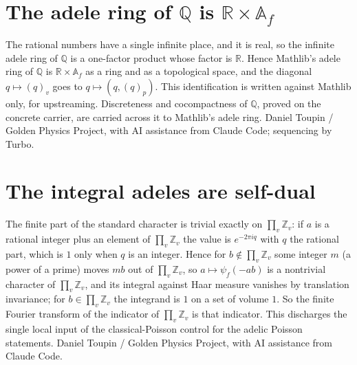 \documentclass{report}
\theoremstyle{definition}
\begin{document}
\begin{itemize}
\begin{itemize}
\section{The adele ring of $\mathbb Q$ is $\mathbb R\times\mathbb A_f$}
The rational numbers have a single infinite place, and it is real, so the infinite adele ring of $\mathbb Q$ is a one-factor product whose factor is $\mathbb R$. Hence Mathlib's adele ring of $\mathbb Q$ is $\mathbb R\times\mathbb A_f$ as a ring and as a topological space, and the diagonal $q\mapsto(q)_v$ goes to $q\mapsto(q,(q)_p)$. This identification is written against Mathlib only, for upstreaming. Discreteness and cocompactness of $\mathbb Q$, proved on the concrete carrier, are carried across it to Mathlib's adele ring.
Daniel Toupin / Golden Physics Project, with AI assistance from Claude Code; sequencing by Turbo.

\section{The integral adeles are self-dual}
The finite part of the standard character is trivial exactly on $\prod_v\mathbb Z_v$: if $a$ is a rational integer plus an element of $\prod_v\mathbb Z_v$ the value is $e^{-2\pi i q}$ with $q$ the rational part, which is $1$ only when $q$ is an integer. Hence for $b\notin\prod_v\mathbb Z_v$ some integer $m$ (a power of a prime) moves $mb$ out of $\prod_v\mathbb Z_v$, so $a\mapsto\psi_f(-ab)$ is a nontrivial character of $\prod_v\mathbb Z_v$, and its integral against Haar measure vanishes by translation invariance; for $b\in\prod_v\mathbb Z_v$ the integrand is $1$ on a set of volume $1$. So the finite Fourier transform of the indicator of $\prod_v\mathbb Z_v$ is that indicator. This discharges the single local input of the classical-Poisson control for the adelic Poisson statements.
Daniel Toupin / Golden Physics Project, with AI assistance from Claude Code.


\end{itemize}
\end{itemize}
\end{document}
